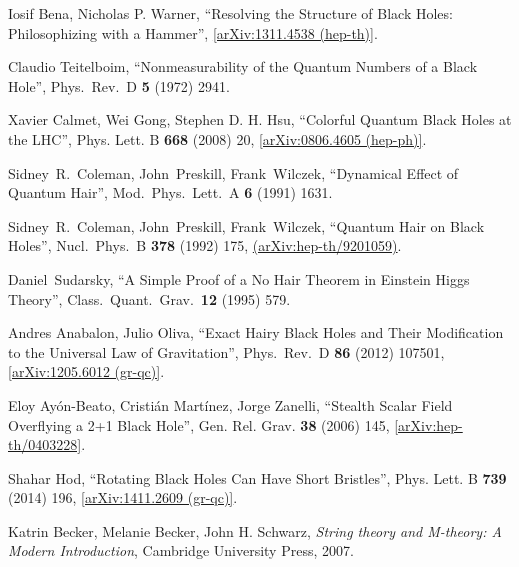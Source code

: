 \documentclass[12pt]{article}
\newcommand{\2}{$^2$}
\newcommand{\3}{$^3$}
\newcommand{\4}{$_4$}
\newcommand{\5}{$_5$}
\begin{document}
\begin{thebibliography}{400}
Iosif Bena, Nicholas P. Warner, ``Resolving the Structure of Black Holes: Philosophizing with a Hammer'', \href{http://arxiv.org/abs/1311.4538}{[arXiv:1311.4538 (hep-th)]}.

  Claudio Teitelboim,
  ``Nonmeasurability of the Quantum Numbers of a Black Hole'',
  Phys.\ Rev.\ D {\bf 5} (1972) 2941.

Xavier Calmet, Wei Gong, Stephen D. H. Hsu, ``Colorful Quantum Black Holes at the LHC'', Phys. Lett. B \textbf{668} (2008) 20, \href{http://arxiv.org/abs/0806.4605}{[arXiv:0806.4605 (hep-ph)]}.


  Sidney~R.~Coleman, John~Preskill, Frank~Wilczek,
  ``Dynamical Effect of Quantum Hair'',
  Mod.\ Phys.\ Lett.\ A {\bf 6} (1991) 1631.

  Sidney~R.~Coleman, John~Preskill, Frank~Wilczek,
  ``Quantum Hair on Black Holes'',
  Nucl.\ Phys.\ B {\bf 378} (1992) 175, \href{http://arxiv.org/abs/hep-th/9201059}{
  (arXiv:hep-th/9201059)}.

  Daniel~Sudarsky,
  ``A Simple Proof of a No Hair Theorem in Einstein Higgs Theory'',
  Class.\ Quant.\ Grav.\  {\bf 12} (1995) 579.

Andres Anabalon, Julio Oliva,
 ``Exact Hairy Black Holes and Their Modification to the Universal Law of Gravitation'',
  Phys.\ Rev.\ D {\bf 86} (2012) 107501,
  \href{http://arxiv.org/abs/1205.6012}{[arXiv:1205.6012 (gr-qc)]}.
	
Eloy Ay\'on-Beato, Cristi\'an Mart\'inez, Jorge Zanelli, ``Stealth Scalar Field Overflying a 2+1 Black Hole'', Gen. Rel. Grav. \textbf{38} (2006) 145, \href{http://arxiv.org/abs/hep-th/0403228}{[arXiv:hep-th/0403228]}.
	
Shahar Hod, ``Rotating Black Holes Can Have Short Bristles'', Phys. Lett. B \textbf{739} (2014) 196, \href{http://arxiv.org/abs/1411.2609}{[arXiv:1411.2609 (gr-qc)]}.

Katrin Becker, Melanie Becker, John H. Schwarz, \textit{String theory and M-theory: A Modern Introduction}, Cambridge University Press, 2007.


\end{thebibliography}
\end{document}
